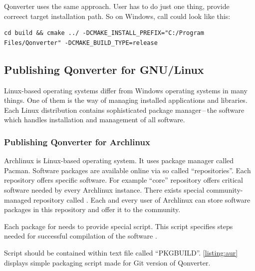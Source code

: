 Qonverter uses the same approach. User has to do just one thing, provide correect target installation path. So on Windows, call could look like this:
\begin{lstlisting}[language=text,numbers=none]
cd build && cmake ../ -DCMAKE_INSTALL_PREFIX="C:/Program Files/Qonverter" -DCMAKE_BUILD_TYPE=release
\end{lstlisting}

\subsection{Publishing Qonverter for GNU/Linux}
Linux-based operating systems differ from Windows operating systems in many things. One of them is the way of managing installed applications and libraries. Each Linux distribution contains sophisticated package manager\,--\,the software which handles installation and management of all software.

\subsubsection{Publishing Qonverter for Archlinux}
Archlinux is Linux-based operating system. It uses package manager called Pacman. Software packages are available online via so called \enquote{repositories}. Each repository offers specific software. For example \enquote{core} repository offers critical software needed by every Archlinux instance. There exists special community-managed repository called . Each and every user of Archlinux can store software packages in this repository and offer it to the community.

Each package for  needs to provide special script. This script specifies steps needed for successful compilation of the software \citep{arch:aur}.

Script should be contained within text file called \enquote{PKGBUILD}. \autoref{listing:aur} displays simple packaging script made for Git version of Qonverter.

